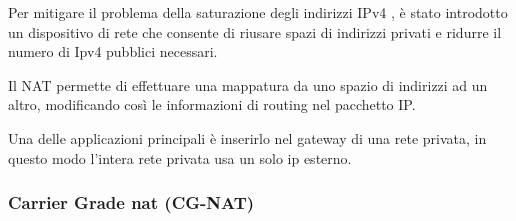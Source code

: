 Per mitigare il problema della saturazione degli indirizzi IPv4 \cite{ipv4_exhaustion}, è stato introdotto un dispositivo di rete che consente di riusare spazi di indirizzi privati e ridurre il numero di Ipv4 pubblici necessari. 

Il NAT \cite{RFC_1631} permette di effettuare una mappatura da uno spazio di indirizzi ad un altro, modificando così le informazioni di routing nel pacchetto IP. 

Una delle applicazioni principali è inserirlo nel gateway di una rete privata, in questo modo l'intera rete privata usa un solo ip esterno.



\subsubsection{Carrier Grade nat (CG-NAT)}

